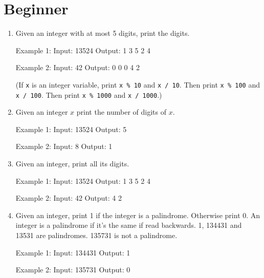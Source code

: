 \newpage
\section{Beginner}

\newpage
\begin{enumerate}

\item 
Given an integer with at most 5 digits, print the digits.
\begin{consolethree}
Example 1:
Input: 13524
Output: 1 3 5 2 4

Example 2:
Input: 42
Output: 0 0 0 4 2
\end{consolethree}
(If \verb!x! is an integer variable, print \verb!x % 10! and
\verb!x / 10!.
Then print \verb!x % 100! and
\verb!x / 100!.
Then print \verb!x % 1000! and
\verb!x / 1000!.)
\newpage

\item 
Given an integer $x$ print the number of digits of $x$.
\begin{consolethree}
Example 1:
Input: 13524
Output: 5

Example 2:
Input: 8
Output: 1
\end{consolethree}
\newpage

\item 
Given an integer, print all its digits.
\begin{consolethree}
Example 1:
Input: 13524
Output: 1 3 5 2 4

Example 2:
Input: 42
Output: 4 2
\end{consolethree}
\newpage


\item 
Given an integer, print 1 if the integer is a palindrome.
Otherwise print 0.
An integer is a palindrome if it's the same if read backwards.
1, 134431 and 13531 are palindromes.
135731 is not a palindrome.
\begin{consolethree}
Example 1:
Input: 134431
Output: 1

Example 2:
Input: 135731
Output: 0
\end{consolethree}
\newpage


\end{enumerate}
